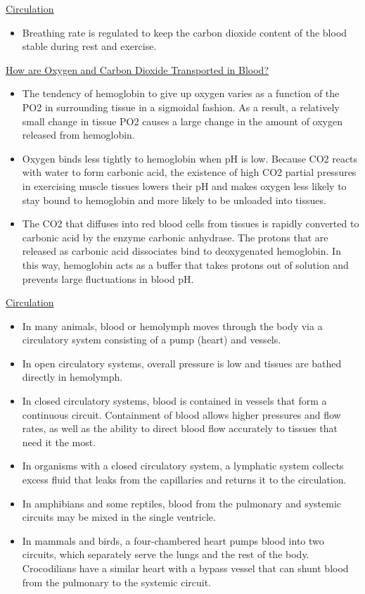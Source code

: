 \documentclass[12pt,letterpaper]{article}
\begin{document}
\begin{secbox}{\hyperlink{42}{Circulation}}
{\begin{itemize}
        \item Breathing rate is regulated to keep the carbon dioxide content of the blood stable during rest and exercise.
    \end{itemize}
    \hyperlink{42.4}{How are Oxygen and Carbon Dioxide Transported in Blood?}
    \begin{itemize}
        \item The tendency of hemoglobin to give up oxygen varies as a function of the PO2 in surrounding tissue in a sigmoidal fashion. As a result, a relatively small change in tissue PO2 causes a large change in the amount of oxygen released from hemoglobin. 
        \item Oxygen binds less tightly to hemoglobin when pH is low. Because CO2 reacts with water to form carbonic acid, the existence of high CO2 partial pressures in exercising muscle tissues lowers their pH and makes oxygen less likely to stay bound to hemoglobin and more likely to be unloaded into tissues. 
        \item The CO2 that diffuses into red blood cells from tissues is rapidly converted to carbonic acid by the enzyme carbonic anhydrase. The protons that are released as carbonic acid dissociates bind to deoxygenated hemoglobin. In this way, hemoglobin acts as a buffer that takes protons out of solution and prevents large fluctuations in blood pH.
    \end{itemize}
    \hyperlink{42.5}{Circulation}
    \begin{itemize}
        \item In many animals, blood or hemolymph moves through the body via a circulatory system consisting of a pump (heart) and vessels. 
        \item In open circulatory systems, overall pressure is low and tissues are bathed directly in hemolymph. 
        \item In closed circulatory systems, blood is contained in vessels that form a continuous circuit. Containment of blood allows higher pressures and flow rates, as well as the ability to direct blood flow accurately to tissues that need it the most. 
        \item In organisms with a closed circulatory system, a lymphatic system collects excess fluid that leaks from the capillaries and returns it to the circulation. 
        \item In amphibians and some reptiles, blood from the pulmonary and systemic circuits may be mixed in the single ventricle. 
        \item In mammals and birds, a four-chambered heart pumps blood into two circuits, which separately serve the lungs and the rest of the body. Crocodilians have a similar heart with a bypass vessel that can shunt blood from the pulmonary to the systemic circuit. 

\end{itemize}}
\end{secbox}
\end{document}

